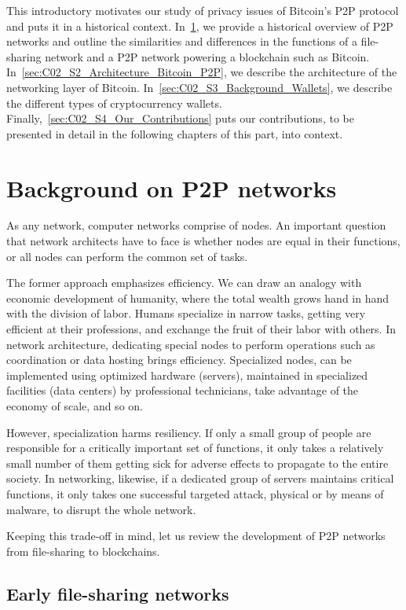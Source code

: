 This introductory motivates our study of privacy issues of Bitcoin's P2P protocol and puts it in a historical context.
In~\ref{sec:C02_S1_Background_P2P}, we provide a historical overview of P2P networks and outline the similarities and differences in the functions of a file-sharing network and a P2P network powering a blockchain such as Bitcoin.
In~\ref{sec:C02_S2_Architecture_Bitcoin_P2P}, we describe the architecture of the networking layer of Bitcoin.
In~\ref{sec:C02_S3_Background_Wallets}, we describe the different types of cryptocurrency wallets.
Finally,~\ref{sec:C02_S4_Our_Contributions} puts our contributions, to be presented in detail in the following chapters of this part, into context.


\section{Background on P2P networks}
\label{sec:C02_S1_Background_P2P}

As any network, computer networks comprise of nodes.
An important question that network architects have to face is whether nodes are equal in their functions, or all nodes can perform the common set of tasks.

The former approach emphasizes efficiency.
We can draw an analogy with economic development of humanity, where the total wealth grows hand in hand with the division of labor.
Humans specialize in narrow tasks, getting very efficient at their professions, and exchange the fruit of their labor with others.
In network architecture, dedicating special nodes to perform operations such as coordination or data hosting brings efficiency.
Specialized nodes, can be implemented using optimized hardware (servers), maintained in specialized facilities (data centers) by professional technicians, take advantage of the economy of scale, and so on.

However, specialization harms resiliency.
If only a small group of people are responsible for a critically important set of functions, it only takes a relatively small number of them getting sick for adverse effects to propagate to the entire society.
In networking, likewise, if a dedicated group of servers maintains critical functions, it only takes one successful targeted attack, physical or by means of malware, to disrupt the whole network.

Keeping this trade-off in mind, let us review the development of P2P networks from file-sharing to blockchains.


\subsection{Early file-sharing networks}


